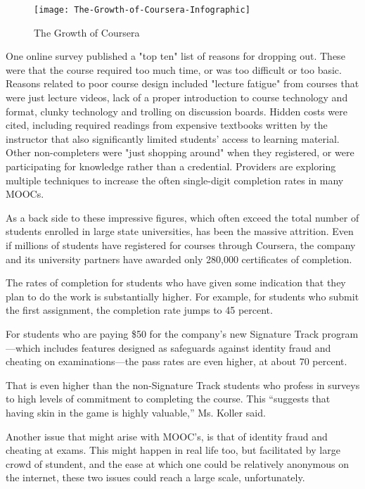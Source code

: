 \begin{figure}[p]
    \centering
    \texttt{[image: The-Growth-of-Coursera-Infographic]}
    \caption[Coursera]{The Growth of Coursera}
    \label{fig:The growth of Coursera}
\end{figure}

One online survey published a "top ten" list of reasons for dropping out.
These were that the course required too much time, or was too difficult or too
basic. Reasons related to poor course design included "lecture fatigue" from
courses that were just lecture videos, lack of a proper introduction to course
technology and format, clunky technology and trolling on discussion boards.
Hidden costs were cited, including required readings from expensive textbooks
written by the instructor that also significantly limited students' access to
learning material. Other non-completers were "just shopping around" when
they registered, or were participating for knowledge rather than a credential.
Providers are exploring multiple techniques to increase the often single-digit
completion rates in many MOOCs.

As a back side to these impressive figures, which often exceed the
total number of students enrolled in large state universities, has been the massive attrition.
Even if millions of students have registered for courses through Coursera, the
company and its university partners have awarded only 280,000 certificates of
completion.

The rates of completion for students who have given some indication that they
plan to do the work is substantially higher. For example, for students who
submit the first assignment, the completion rate jumps to 45 percent.

For students who are paying \$50 for the company’s new Signature Track
program—which includes features designed as safeguards against identity fraud
and cheating on examinations—the pass rates are even higher, at about 70
percent.

That is even higher than the non-Signature Track students who profess
in surveys to high levels of commitment to completing the course. This “suggests
that having skin in the game is highly valuable,” Ms. Koller
said\citep{courseradropout}.

Another issue that might arise with MOOC's, is that of identity fraud and cheating
at exams. This might happen in real life too, but facilitated by large crowd of stundent,
and the ease at which one could be relatively anonymous on the internet, these
two issues could reach a large scale, unfortunately.

